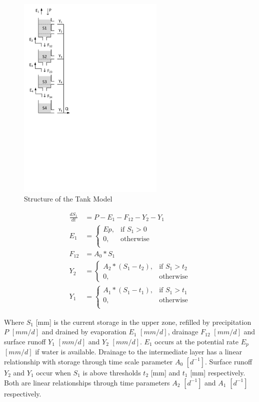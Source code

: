 { 																	%
\begin{figure}
\includegraphics[trim=1cm 12cm 7cm 1cm,width=7cm,keepaspectratio]{./files/27_schematic.pdf}
\caption{Structure of the Tank Model} \label{fig:27_schematic}
\end{figure}

\begin{align}
	\frac{dS_1}{dt} &= P-E_1-F_{12}-Y_2-Y_1 \\
	E_1 &= \begin{cases}
		Ep, &\text{if } S_1 > 0 \\
		0, & \text{otherwise} \\
	\end{cases} \\
	F_{12} &= A_0*S_1\\
	Y_2 &= 
	\begin{cases}
		A_2*(S_1-t_2), & \text{if } S_1 > t_2 \\
		0, & \text{otherwise}
	\end{cases}\\
	Y_1 &= 
	\begin{cases}
		A_1*(S_1-t_1), & \text{if } S_1 > t_1 \\
		0, & \text{otherwise}\\
	\end{cases}
\end{align}

Where $S_1$ [mm] is the current storage in the upper zone, refilled by precipitation $P$ $[mm/d]$ and drained by evaporation $E_1$ $[mm/d]$, drainage $F_{12}$ $[mm/d]$ and surface runoff $Y_1$ $[mm/d]$ and $Y_2$ $[mm/d]$. $E_1$ occurs at the potential rate $E_p$ $[mm/d]$ if water is available. Drainage to the intermediate layer has a linear relationship with storage through time scale parameter $A_0$ $[d^{-1}]$. Surface runoff $Y_2$ and $Y_1$ occur when $S_1$ is above thresholds $t_2$ [mm] and $t_1$ [mm] respectively. Both are linear relationships through time parameters $A_2$ $[d^{-1}]$ and $A_1$ $[d^{-1}]$ respectively.

} %

